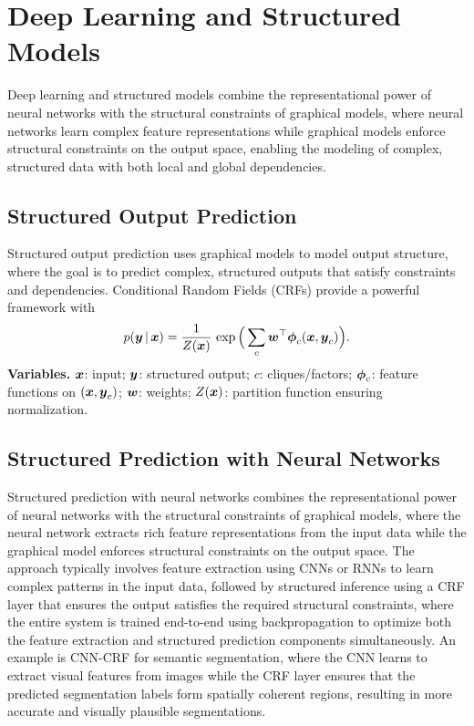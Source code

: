 
\section{Deep Learning and Structured Models }
\label{sec:deep-structured}

Deep learning and structured models combine the representational power of neural networks with the structural constraints of graphical models, where neural networks learn complex feature representations while graphical models enforce structural constraints on the output space, enabling the modeling of complex, structured data with both local and global dependencies.

\subsection{Structured Output Prediction}

Structured output prediction uses graphical models to model output structure, where the goal is to predict complex, structured outputs that satisfy constraints and dependencies. Conditional Random Fields (CRFs) provide a powerful framework with
\begin{equation}
p(\boldsymbol{y}\,|\,\boldsymbol{x}) = \frac{1}{Z(\boldsymbol{x})} \, \exp\Big(\sum_{c} \boldsymbol{w}^\top \boldsymbol{\phi}_c(\boldsymbol{x}, \boldsymbol{y}_c)\Big).
\end{equation}
\noindent\textbf{Variables.} $\boldsymbol{x}$: input; $\boldsymbol{y}$: structured output; $c$: cliques/factors; $\boldsymbol{\phi}_c$: feature functions on $(\boldsymbol{x},\boldsymbol{y}_c)$; $\boldsymbol{w}$: weights; $Z(\boldsymbol{x})$: partition function ensuring normalization.

\subsection{Structured Prediction with Neural Networks}

Structured prediction with neural networks combines the representational power of neural networks with the structural constraints of graphical models, where the neural network extracts rich feature representations from the input data while the graphical model enforces structural constraints on the output space. The approach typically involves feature extraction using CNNs or RNNs to learn complex patterns in the input data, followed by structured inference using a CRF layer that ensures the output satisfies the required structural constraints, where the entire system is trained end-to-end using backpropagation to optimize both the feature extraction and structured prediction components simultaneously. An example is CNN-CRF for semantic segmentation, where the CNN learns to extract visual features from images while the CRF layer ensures that the predicted segmentation labels form spatially coherent regions, resulting in more accurate and visually plausible segmentations.

